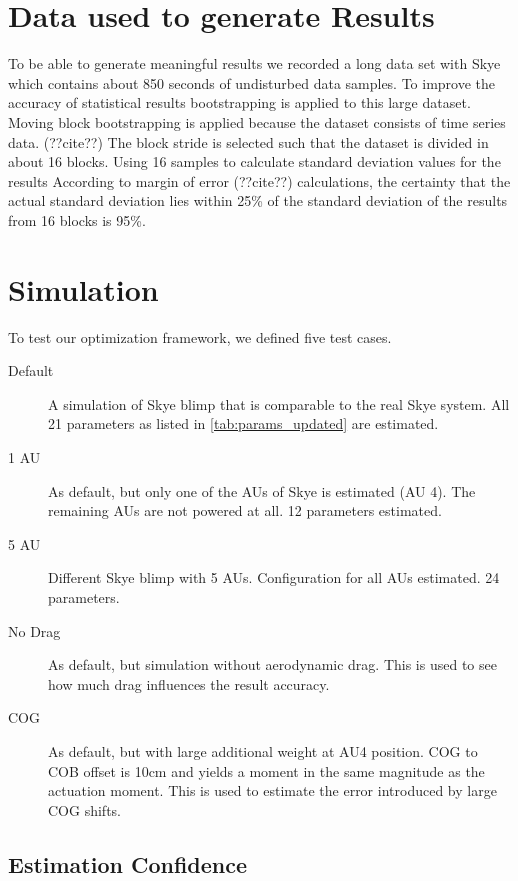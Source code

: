 \section{Data used to generate Results}
To be able to generate meaningful results we recorded a long data set with Skye which contains about 850 seconds of undisturbed data samples.
To improve the accuracy of statistical results bootstrapping is applied to this large dataset.
Moving block bootstrapping is applied because the dataset consists of time series data. (??cite??)
The block stride is selected such that the dataset is divided in about 16 blocks.
Using 16 samples to calculate standard deviation values for the results 
According to margin of error (??cite??) calculations, the certainty that the actual standard deviation lies within 25\% of the standard deviation of the results from 16 blocks is 95\%.

\section{Simulation}
To test our optimization framework, we defined five test cases.
\begin{description}
\item[Default] A simulation of Skye blimp that is comparable to the real Skye system. All 21 parameters as listed in \cref{tab:params_updated} are estimated.
\item[1 AU] As default, but only one of the AUs of Skye is estimated (AU 4). The remaining AUs are not powered at all. 12 parameters estimated.
\item[5 AU] Different Skye blimp with 5 AUs. Configuration for all AUs estimated. 24 parameters.
\item[No Drag] As default, but simulation without aerodynamic drag. This is used to see how much drag influences the result accuracy.
\item[COG] As default, but with large additional weight at AU4 position. COG to COB offset is 10cm and yields a moment in the same magnitude as the actuation moment. This is used to estimate the error introduced by large COG shifts.
\end{description}

\subsection{Estimation Confidence}

